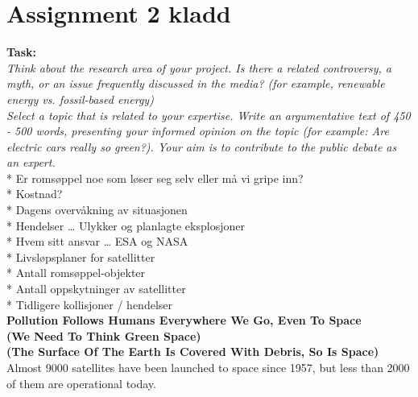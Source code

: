 \section{Assignment 2 kladd}

\textbf{Task:} \\
\textit{Think about the research area of your project. Is there a related controversy, a myth, or an issue frequently discussed in the media? (for example, renewable energy vs. fossil-based energy) } \\

\textit{Select a topic that is related to your expertise. Write an argumentative text of 450 - 500 words, presenting your informed opinion on the topic (for example: Are electric cars really so green?). Your aim is to contribute to the public debate as an expert. }  \\


* Er romsøppel noe som løser seg selv eller må vi gripe inn? \\

* Kostnad? \\

* Dagens overvåkning av situasjonen \\

* Hendelser … Ulykker og planlagte eksplosjoner \\

* Hvem sitt ansvar … ESA og NASA \\

* Livsløpsplaner for satellitter \\

* Antall romsøppel-objekter  \\

* Antall oppskytninger av satellitter \\

* Tidligere kollisjoner / hendelser \\




\textbf{Pollution Follows Humans Everywhere We Go, Even To Space} \\

\textbf{(We Need To Think Green Space)} \\

\textbf{(The Surface Of The Earth Is Covered With Debris, So Is Space)} \\


Almost 9000 satellites have been launched to space since 1957, but less than 2000 of them are operational today\cite{ESA_space_debris_figures}. \\


